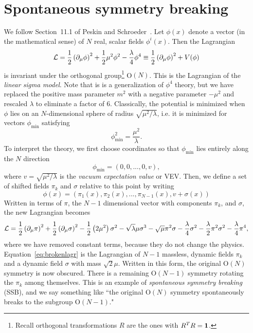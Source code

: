 \section{Spontaneous symmetry breaking}\label{sec:ssb}
We follow Section~11.1 of Peskin and 
Schroeder~\cite{peskin_introduction_1995}.
Let $\phi(x)$ denote a vector (in the mathematical sense) of $N$ real,
scalar fields $\phi^i(x)$. Then the Lagrangian
\begin{equation}
  \mathcal{L}=\frac{1}{2}\left(\partial_\mu\phi\right)^2
        +\frac{1}{2}\mu^2\phi^2-\frac{\lambda}{4}\phi^4
       \equiv\frac{1}{2}\left(\partial_\mu\phi\right)^2
        +V(\phi)
\end{equation}
is invariant under the orthogonal group\footnote{Recall orthogonal 
transformations $R$ are the ones with 
$R^TR={\mathbf 1}$.} O$(N)$. This is the Lagrangian of the
{\it linear sigma model}. Note that is is a generalization of $\phi^4$ theory,
but we have replaced the positive mass parameter $m^2$ with a
negative parameter $-\mu^2$ and rescaled $\lambda$ to eliminate a factor of 6.
Classically, the potential is minimized when $\phi$ lies
on an $N$-dimensional sphere of radius $\sqrt{\mu^2/\lambda}$, i.e. 
it is minimized for vectors $\phi_\text{min}$ satisfying
\begin{equation}
  \phi_\text{min}^2=\frac{\mu^2}{\lambda}.
\end{equation}
To interpret the theory, we first choose coordinates so that 
$\phi_\text{min}$ lies
entirely along the $N$ direction
\begin{equation}\label{eq:phidir}
  \phi_\text{min}=(0,0,...,0,v),
\end{equation}
where $v=\sqrt{\mu^2/\lambda}$ is the {\it vacuum expectation value} or VEV.
Then, we define a set of shifted fields $\pi_k$ and $\sigma$ relative
to this point by writing
\begin{equation}\label{eq:phishift}
  \phi(x)=\left(\pi_1(x),\pi_2(x),...,\pi_{N-1}(x),v+\sigma(x)\right)
\end{equation}
Written in terms of $\pi$, the $N-1$ dimensional vector with components
$\pi_k$, and $\sigma$, the new Lagrangian becomes
\begin{equation}\label{eq:brokenlagr}
  \mathcal{L}=\frac{1}{2}\left(\partial_\mu\pi\right)^2
        +\frac{1}{2}\left(\partial_\mu\sigma\right)^2
        -\frac{1}{2}\left(2\mu^2\right)\sigma^2-\sqrt{\lambda}\mu\sigma^3
        -\sqrt\mu\pi^2\sigma
        -\frac{\lambda}{4}\sigma^2
        -\frac{\lambda}{2}\pi^2\sigma^2
        -\frac{\lambda}{4}\pi^4,
\end{equation}
where we have removed constant terms, because they do not change the
physics. Equation~\eqref{eq:brokenlagr} is the Lagrangian of $N-1$
massless, dynamic fields $\pi_k$ and a dynamic field $\sigma$ with mass
$\sqrt{2}\mu$. Written in this form, the original $\text{O}(N)$ symmetry
is now obscured. There is a remaining $\text{O}(N-1)$ symmetry
rotating the $\pi_k$ among themselves. This is an example of
{\it spontaneous symmetry breaking} (SSB), and we say something like
``the original $\text{O}(N)$ symmetry spontaneously breaks to
the subgroup $\text{O}(N-1)$." 

